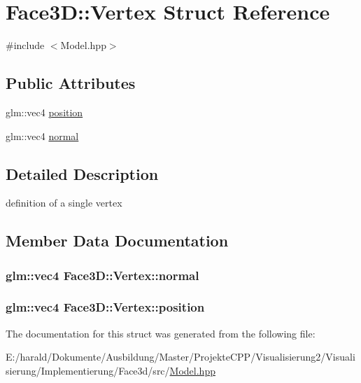 \hypertarget{struct_face3_d_1_1_vertex}{}\section{Face3D\+:\+:Vertex Struct Reference}
\label{struct_face3_d_1_1_vertex}


{\ttfamily \#include $<$Model.\+hpp$>$}

\subsection*{Public Attributes}
\begin{DoxyCompactItemize}
\item 
glm\+::vec4 \hyperlink{struct_face3_d_1_1_vertex_a79ac5e4dc9a0fd62c167ffdaac9516b1}{position}
\item 
glm\+::vec4 \hyperlink{struct_face3_d_1_1_vertex_ad1020723e88d1adeaaaa74569614ca64}{normal}
\end{DoxyCompactItemize}


\subsection{Detailed Description}
definition of a single vertex 

\subsection{Member Data Documentation}
\subsubsection[{\texorpdfstring{normal}{normal}}]{\setlength{\rightskip}{0pt plus 5cm}glm\+::vec4 Face3\+D\+::\+Vertex\+::normal}\hypertarget{struct_face3_d_1_1_vertex_ad1020723e88d1adeaaaa74569614ca64}{}\label{struct_face3_d_1_1_vertex_ad1020723e88d1adeaaaa74569614ca64}
\subsubsection[{\texorpdfstring{position}{position}}]{\setlength{\rightskip}{0pt plus 5cm}glm\+::vec4 Face3\+D\+::\+Vertex\+::position}\hypertarget{struct_face3_d_1_1_vertex_a79ac5e4dc9a0fd62c167ffdaac9516b1}{}\label{struct_face3_d_1_1_vertex_a79ac5e4dc9a0fd62c167ffdaac9516b1}


The documentation for this struct was generated from the following file\+:\begin{DoxyCompactItemize}
\item 
E\+:/harald/\+Dokumente/\+Ausbildung/\+Master/\+Projekte\+C\+P\+P/\+Visualisierung2/\+Visualisierung/\+Implementierung/\+Face3d/src/\hyperlink{_model_8hpp}{Model.\+hpp}\end{DoxyCompactItemize}
